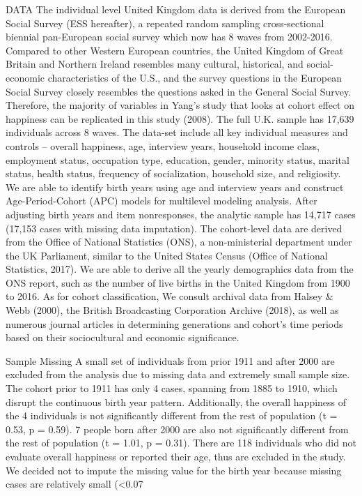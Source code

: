 DATA
The individual level United Kingdom data is derived from the European Social Survey (ESS hereafter), a repeated random sampling cross-sectional biennial pan-European social survey which now has 8 waves from 2002-2016. Compared to other Western European countries, the United Kingdom of Great Britain and Northern Ireland resembles many cultural, historical, and social-economic characteristics of the U.S., and the survey questions in the European Social Survey closely resembles the questions asked in the General Social Survey. Therefore, the majority of variables in Yang’s study that looks at cohort effect on happiness can be replicated in this study (2008). The full U.K. sample has 17,639 individuals across 8 waves. The data-set include all key individual measures and controls – overall happiness, age, interview years, household income class, employment status, occupation type, education, gender, minority status, marital status, health status, frequency of socialization, household size, and religiosity. We are able to identify birth years using age and interview years and construct Age-Period-Cohort (APC) models for multilevel modeling analysis. After adjusting birth years and item nonresponses, the analytic sample has 14,717 cases (17,153 cases with missing data imputation).
The cohort-level data are derived from the Office of National Statistics (ONS), a non-ministerial department under the UK Parliament, similar to the United States Census (Office of National Statistics, 2017). We are able to derive all the yearly demographics data from the ONS report, such as the number of live births in the United Kingdom from 1900 to 2016. As for cohort classification, We consult archival data from Halsey & Webb (2000), the British Broadcasting Corporation Archive (2018), as well as numerous journal articles in determining generations and cohort’s time periods based on their sociocultural and economic significance.

Sample Missing
A small set of individuals from prior 1911 and after 2000 are excluded from the analysis due to missing data and extremely small sample size. The cohort prior to 1911 has only 4 cases, spanning from 1885 to 1910, which disrupt the continuous birth year pattern. Additionally, the overall happiness of the 4 individuals is not significantly different from the rest of population (t = 0.53, p = 0.59). 7 people born after 2000 are also not significantly different from the rest of population (t = 1.01, p = 0.31). There are 118 individuals who did not evaluate overall happiness or reported their age, thus are excluded in the study. We decided not to impute the missing value for the birth year because missing cases are relatively small (<0.07%

